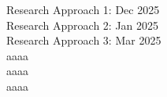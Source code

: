 Research Approach 1: Dec 2025\\
Research Approach 2: Jan 2025\\
Research Approach 3: Mar 2025\\
aaaa\\
aaaa\\
aaaa